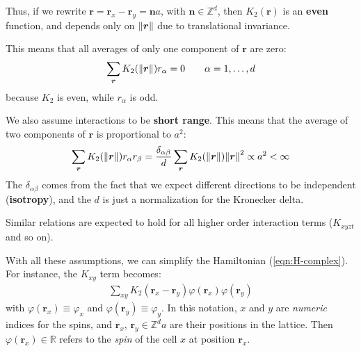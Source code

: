 \documentclass[../../main.tex]{subfiles}
\begin{document}
Thus, if we rewrite $\bm{r} = \bm{r}_x - \bm{r}_y = \bm{n} a$, with $\bm{n} \in \mathbb{Z}^d$, then $K_2(\bm{r})$ is an \textbf{even} function, and depends only on $\norm{\bm{r}}$ due to translational invariance.

This means that all averages of only one component of $\bm{r}$ are zero:
\begin{align}\label{eqn:r-average}
    \sum_{\bm{r}} K_2(\norm{\bm{r}}) r_\alpha = 0 \qquad \alpha=1,\dots,d
\end{align}
because $K_2$ is even, while $r_\alpha$ is odd.

\medskip

We also assume interactions to be \textbf{short range}. This means that the average of two components of $\bm{r}$ is proportional to $a^2$: 
\begin{align}\label{eqn:rr-average}
    \sum_{\bm{r}} K_2(\norm{\bm{r}}) r_\alpha r_\beta = \frac{\delta_{\alpha \beta}}{d}  \sum_{\bm{r}} K_2(\norm{\bm{r}}) \norm{\bm{r}}^2 \propto a^2 < \infty
\end{align} 
The $\delta_{\alpha \beta}$ comes from the fact that we expect different directions to be independent (\textbf{isotropy}), and the $d$ is just a normalization for the Kronecker delta.

\medskip

Similar relations are expected to hold for all higher order interaction terms ($K_{xyzt}$ and so on).

\medskip

With all these assumptions, we can simplify the Hamiltonian (\ref{eqn:H-complex}). For instance, the $K_{xy}$ term becomes:
\begin{align*}
    \sum_{xy} K_2(\bm{r}_x - \bm{r}_y) \varphi(\bm{r}_x) \varphi(\bm{r}_y)
\end{align*}
with $\varphi(\bm{r}_x) \equiv \varphi_x$ and $\varphi(\bm{r}_y) \equiv \varphi_y$. In this notation, $x$ and $y$ are \textit{numeric} indices for the spins, and $\bm{r}_x$, $\bm{r}_y \in \mathbb{Z}^d a$ are their positions in the lattice. Then $\varphi(\bm{r}_x) \in \mathbb{R}$ refers to the \textit{spin} of the cell $x$ at position $\bm{r}_x$. 

\medskip
\end{document}
